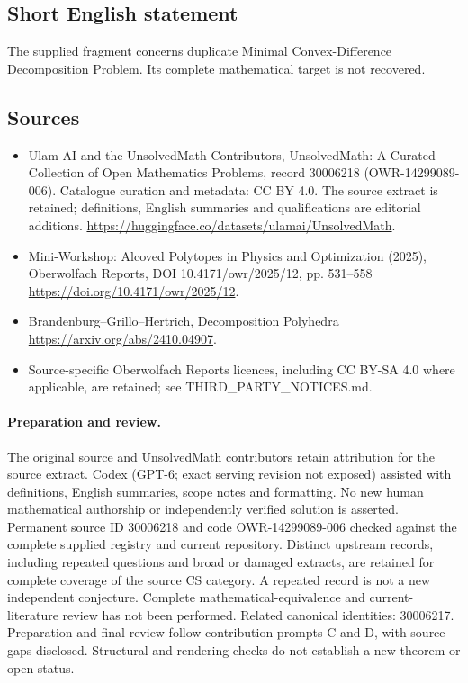 \documentclass[11pt]{article}
\begin{document}
\subsection{Short English statement}
The supplied fragment concerns duplicate Minimal Convex-Difference Decomposition Problem. Its complete mathematical target is not recovered.
\subsection{Sources}
\begin{itemize}
\item[S1] Ulam AI and the UnsolvedMath Contributors, UnsolvedMath: A Curated Collection of Open Mathematics Problems, record 30006218 (OWR-14299089-006). Catalogue curation and metadata: CC BY 4.0. The source extract is retained; definitions, English summaries and qualifications are editorial additions.
\url{https://huggingface.co/datasets/ulamai/UnsolvedMath}.
\item[S2] Mini-Workshop: Alcoved Polytopes in Physics and Optimization (2025), Oberwolfach Reports, DOI 10.4171/owr/2025/12, pp. 531--558
\url{https://doi.org/10.4171/owr/2025/12}.
\item[S3] Brandenburg--Grillo--Hertrich, Decomposition Polyhedra
\url{https://arxiv.org/abs/2410.04907}.
\item Source-specific Oberwolfach Reports licences, including CC BY-SA 4.0 where applicable, are retained; see THIRD\_PARTY\_NOTICES.md.
\end{itemize}
\paragraph{Preparation and review.}
The original source and UnsolvedMath contributors retain attribution for the source extract. Codex (GPT-6; exact serving revision not exposed) assisted with definitions, English summaries, scope notes and formatting. No new human mathematical authorship or independently verified solution is asserted. Permanent source ID 30006218 and code OWR-14299089-006 checked against the complete supplied registry and current repository. Distinct upstream records, including repeated questions and broad or damaged extracts, are retained for complete coverage of the source CS category. A repeated record is not a new independent conjecture. Complete mathematical-equivalence and current-literature review has not been performed. Related canonical identities: 30006217. Preparation and final review follow contribution prompts C and D, with source gaps disclosed. Structural and rendering checks do not establish a new theorem or open status.
\label{end:30006218}
\end{document}
